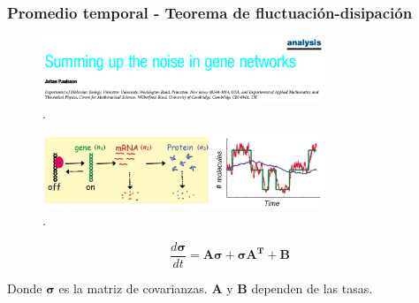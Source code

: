 \documentclass{beamer}
\begin{document}
\iffalse
\begin{frame}
\frametitle{Promedio temporal - Teorema de fluctuaci\'on-disipaci\'on}
\begin{figure}[p]
    \centering
    \includegraphics[width=0.75\textwidth]{paulsson04.png}\\
    \tiny \cite{paulsson04}.
\end{figure}

\begin{figure}[p]
    \centering
    \includegraphics[width=0.75\textwidth]{timeave.png}\\
    \tiny \cite{paulsson05}.
\end{figure}

$$\frac{d\pmb{\sigma}}{dt} = \pmb{A\sigma} + \pmb{\sigma A^T} + \pmb{B}$$

Donde $\pmb{\sigma}$ es la matriz de covarianzas. $\pmb{A}$ y $\pmb{B}$ dependen de las tasas.

\end{frame}
\end{document}
